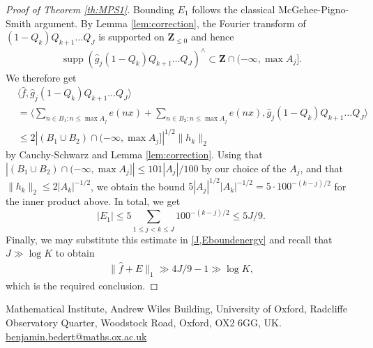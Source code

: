 \documentclass[11pt, reqno]{amsart}
\DeclareMathOperator\supp{supp}
\begin{document}
\begin{proof}[Proof of Theorem \ref{th:MPS1}]
Bounding $E_1$ follows the classical McGehee-Pigno-Smith argument. By Lemma \ref{lem:correction}, the Fourier transform of $(1-Q_{k})Q_{k+1}\dots Q_{J}$ is supported on $\mathbf{Z}_{\leqslant 0}$ and hence
\begin{align*}
    \supp \left(\hat{g}_j(1-Q_{k})Q_{k+1}\dots Q_{J}\right)^{\wedge}\subset \mathbf{Z}\cap(-\infty,\max A_{j}].
\end{align*}
We therefore get 
\begin{align*}
&\langle \hat{f}, \hat{g}_j(1-Q_k)Q_{k+1}\dots Q_J\rangle\\
&= \langle \sum_{n\in B_1:n\leqslant \max A_j} e(nx) + \sum_{n\in B_2: n\leqslant \max A_j} e(nx), \hat{g}_j(1-Q_k)Q_{k+1}\dots Q_J\rangle\\
&\leqslant 2|(B_1\cup B_2)\cap(-\infty,\max A_j]|^{1/2}\lVert h_k\rVert_2 
\end{align*}
by Cauchy-Schwarz and Lemma \ref{lem:correction}. Using that $|(B_1\cup B_2)\cap (-\infty,\max A_j]|\leqslant 101|A_j|/100$ by our choice of the $A_j$, and that $\lVert h_k\rVert_2\leqslant 2|A_k|^{-1/2}$, we obtain the bound $5|A_j|^{1/2}|A_k|^{-1/2}=5\cdot 100^{-(k-j)/2}$ for the inner product above. In total, we get
$$|E_1|\leqslant 5\sum_{1\leqslant j<k\leqslant J} 100^{-(k-j)/2}\leqslant 5J/9.$$ Finally, we may substitute this estimate in \eqref{J,Eboundenergy} and recall that $J\gg \log K$ to obtain
\begin{align*}
    \lVert \hat{f}+E\rVert_1\gg 4J/9-1\gg \log K,
\end{align*}
which is the required conclusion.

\end{proof}



\bigskip

\noindent
{\sc Mathematical Institute, Andrew Wiles Building, University of Oxford, Radcliffe
Observatory Quarter, Woodstock Road, Oxford, OX2 6GG, UK.}\newline
\href{mailto:benjamin.bedert@magd.ox.ac.uk}{\small benjamin.bedert@maths.ox.ac.uk}
\end{document}
